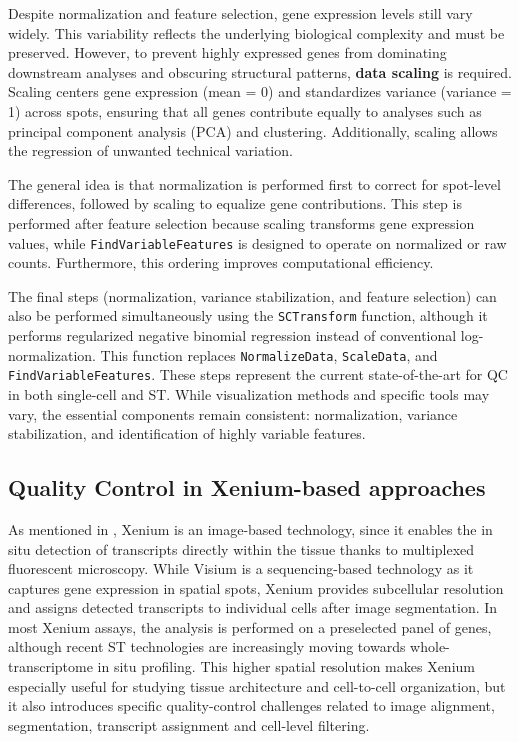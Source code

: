 Despite normalization and feature selection, gene expression levels still vary widely. This variability reflects the underlying biological complexity and must be preserved. However, to prevent highly expressed genes from dominating downstream analyses and obscuring structural patterns, \textbf{data scaling} is required. Scaling centers gene expression (mean = 0) and standardizes variance (variance = 1) across spots, ensuring that all genes contribute equally to analyses such as principal component analysis (PCA) and clustering. Additionally, scaling allows the regression of unwanted technical variation.

The general idea is that normalization is performed first to correct for spot-level differences, followed by scaling to equalize gene contributions. This step is performed after feature selection because scaling transforms gene expression values, while \verb|FindVariableFeatures| is designed to operate on normalized or raw counts. Furthermore, this ordering improves computational efficiency.

The final steps (normalization, variance stabilization, and feature selection) can also be performed simultaneously using the \verb|SCTransform| function\cite{SeuratVisium}, although it performs regularized negative binomial regression instead of conventional log-normalization. This function replaces \verb|NormalizeData|, \verb|ScaleData|, and \verb|FindVariableFeatures|. These steps represent the current state-of-the-art for QC in both single-cell and ST. While visualization methods and specific tools may vary, the essential components remain consistent: normalization, variance stabilization, and identification of highly variable features.


\subsection{Quality Control in Xenium-based approaches}

As mentioned in , Xenium is an image-based technology, since it enables the in situ detection of transcripts directly within the tissue thanks to multiplexed fluorescent microscopy. While Visium is a sequencing-based technology as it captures gene expression in spatial spots, Xenium provides subcellular resolution and assigns detected transcripts to individual cells after image segmentation. In most Xenium assays, the analysis is performed on a preselected panel of genes, although recent ST technologies are increasingly moving towards whole-transcriptome in situ profiling. This higher spatial resolution makes Xenium especially useful for studying tissue architecture and cell-to-cell organization, but it also introduces specific quality-control challenges related to image alignment, segmentation, transcript assignment and cell-level filtering. 

